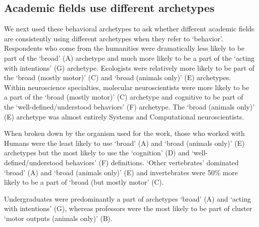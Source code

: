\documentclass[a4paper, 11pt]{article}
\begin{document}
\subsection*{Academic fields use different archetypes}
We next used these behavioral archetypes to ask whether different academic fields are consistently using different archetypes when they refer to `behavior'. Respondents who come from the humanities were dramatically less likely to be part of the `broad' (A) archetype and much more likely to be a part of the `acting with intentions' (G) archetype. Ecologists were relatively more likely to be part of the `broad (mostly motor)' (C) and `broad (animals only)' (E) archetypes. Within neuroscience specialties, molecular neuroscientists were more likely to be a part of the `broad (mostly motor)' (C) archetype and cognitive to be part of the `well-defined/understood behaviors' (F) archetype. The `broad (animals only)' (E) archetype was almost entirely Systems and Computational neuroscientists.

When broken down by the organism used for the work, those who worked with Humans were the least likely to use `broad' (A) and `broad (animals only)' (E) archetypes but the most likely to use the `cognition' (D) and `well-defined/understood behaviors' (F) definitions. `Other vertebrates' dominated `broad' (A) and `broad (animals only)' (E) and invertebrates were 50\% more likely to be a part of `broad (but mostly motor' (C).

Undergraduates were predominantly a part of archetypes `broad' (A) and `acting with intentions' (G), whereas professors were the most likely to be part of cluster `motor outputs (animals only)' (B).
\end{document}
